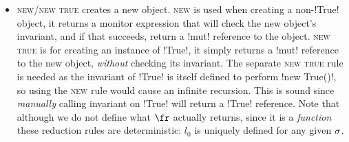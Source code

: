 \begin{itemize}
\item \textsc{new/new true} creates a new object.
\textsc{new} is used when creating a non-\Q!True! object, it returns a monitor expression that will check the new object's invariant, and if that succeeds, return a \Q!mut! reference to the object.
\textsc{new true} is for creating an instance of \Q!True!, 
	it simply returns a \Q!mut! reference to the new object, \emph{without} checking its invariant.
	The separate \textsc{new true} rule is needed as the invariant of \Q!True! is itself defined to perform \Q!new True()!, so using the \textsc{new} rule would cause an infinite recursion.
	This is sound since \emph{manually} calling invariant on \Q!True! will return a \Q!True! reference.
Note that although we do not define what $\fr$ actually returns, since it is a \emph{function} these reduction rules are deterministic: $l_0$ is uniquely defined for any given $\sigma$.


\end{itemize}
